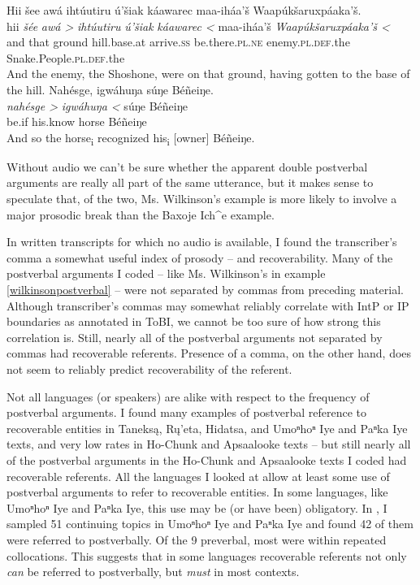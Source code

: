 \documentclass[output=paper]{LSP/langsci}
\begin{document}
\ea\label{multiplepostverbal}
\ea\label{wilkinsonmultiplepostverbal}
Hii šee awá ihtúutiru ú’šiak káawarec maa-iháa’š Waapúkšaruxpáaka’š.\footnotemark\\
\gll	hii 		\emph{šée} 		\emph{awá >}		\emph{ihtúutiru} 			\emph{ú’šiak} 		\emph{káawarec <}	maa-iháa’š 				\emph{Waapúkšaruxpáaka’š <}\\
	and 		that	 		ground 			hill.base.at	 			arrive.\textsc{ss} 		be.there.\textsc{pl.ne}	enemy.\textsc{pl.def}.the 		Snake.People.\textsc{pl.def}.the\\
\glt	And the enemy, the Shoshone, were on that ground, having gotten to the base of the hill.
\ex\label{baxojemultiplepostverbal}
Nahésge, igwáhuŋa súŋe Béñeiŋe.\footnotemark\\
\gll	\emph{nahésge >}	\emph{igwáhuŋa <}	súŋe 		Béñeiŋe\\
	be.if 			his.know 			horse 		Béñeiŋe\\
\glt	And so the horse\textsubscript{i} recognized his\textsubscript{i} [owner] Béñeiŋe.
\z\z

Without audio we can’t be sure whether the apparent double postverbal arguments are really all part of the same utterance, but it makes sense to speculate that, of the two, Ms. Wilkinson’s example is more likely to involve a major prosodic break than the Baxoje Ich\^{}e example.

In written transcripts for which no audio is available, I found the transcriber’s comma a somewhat useful index of prosody -- and recoverability. Many of the postverbal arguments I coded -- like Ms. Wilkinson’s in example \ref{wilkinsonpostverbal} -- were not separated by commas from preceding material. Although transcriber’s commas may somewhat reliably correlate with IntP or IP boundaries as annotated in ToBI, we cannot be too sure of how strong this correlation is. Still, nearly all of the postverbal arguments not separated by commas had recoverable referents. Presence of a comma, on the other hand, does not seem to reliably predict recoverability of the referent.

Not all languages (or speakers) are alike with respect to the frequency of postverbal arguments. I found many examples of postverbal reference to recoverable entities in Taneksą, Rų’eta, Hidatsa, and Umoⁿhoⁿ Iye and Paⁿka Iye texts, and very low rates in Ho-Chunk and Apsaalooke texts -- but still nearly all of the postverbal arguments in the Ho-Chunk and Apsaalooke texts I coded had recoverable referents. All the languages I looked at allow at least some use of postverbal arguments to refer to recoverable entities. In some languages, like Umoⁿhoⁿ Iye and Paⁿka Iye, this use may be (or have been) obligatory. In \citet{Gordon2008}, I sampled 51 continuing topics in Umoⁿhoⁿ Iye and Paⁿka Iye and found 42 of them were referred to postverbally. Of the 9 preverbal, most were within repeated collocations. This suggests that in some languages recoverable referents not only \emph{can} be referred to postverbally, but \emph{must} in most contexts.
\end{document}
